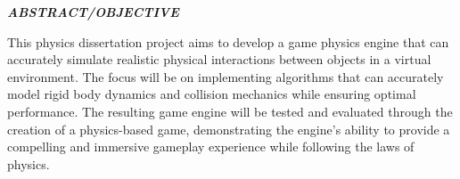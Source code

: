 \begin{center}
    {\Large \textbf{\emph{ABSTRACT/OBJECTIVE}}}
\end{center}

\vspace{10pt}

\begin{spacing}{1.5}
This physics dissertation project aims to develop a game physics engine that can accurately simulate realistic physical interactions between objects in a virtual environment. The focus will be on implementing algorithms that can accurately model rigid body dynamics and collision mechanics while ensuring optimal performance. The resulting game engine will be tested and evaluated through the creation of a physics-based game, demonstrating the engine's ability to provide a compelling and immersive gameplay experience while following the laws of physics.
\end{spacing}

